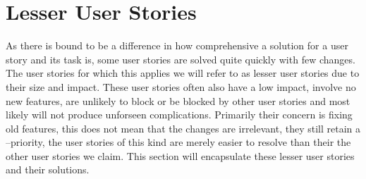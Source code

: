 \section{Lesser User Stories}\label{lessers1}
As there is bound to be a difference in how comprehensive a solution for a user story and its task is, some user stories are solved quite quickly with few changes.
The user stories for which this applies we will refer to as lesser user stories due to their size and impact.
These user stories often also have a low impact, involve no new features, are unlikely to block or be blocked by other user stories and most likely will not produce unforseen complications.
Primarily their concern is fixing old features, this does not mean that the changes are irrelevant, they still retain a \phigh--priority, the user stories of this kind are merely easier to resolve than their the other user stories we claim.
This section will encapsulate these lesser user stories and their solutions.


